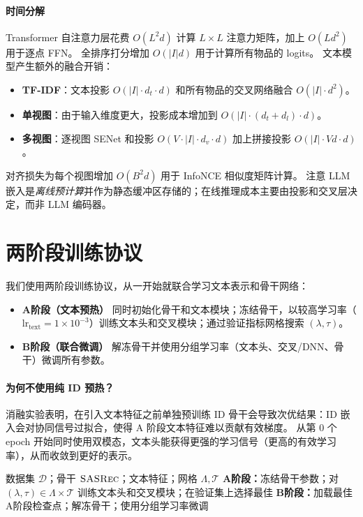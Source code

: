 \documentclass[sigconf,natbib=true]{acmart}
\newcommand{\base}{\textsc{SASRec}\xspace}
\newcommand{\tfidf}{\textsc{TF-IDF}\xspace}
\newcommand{\llm}{\textsc{LLM}\xspace}
\begin{document}
\paragraph{时间分解}
Transformer 自注意力层花费 $O(L^2d)$ 计算 $L\times L$ 注意力矩阵，加上 $O(Ld^2)$ 用于逐点 FFN。
全排序打分增加 $O(|I|d)$ 用于计算所有物品的 logits。
文本模型产生额外的融合开销：
\begin{itemize}[leftmargin=*,itemsep=1pt]
  \item \textbf{\tfidf}：文本投影 $O(|I| \cdot d_t \cdot d)$ 和所有物品的交叉网络融合 $O(|I| \cdot d^2)$。
  \item \textbf{单视图}：由于输入维度更大，投影成本增加到 $O(|I| \cdot (d_t + d_l) \cdot d)$。
  \item \textbf{多视图}：逐视图 SENet 和投影 $O(V \cdot |I| \cdot d_v \cdot d)$ 加上拼接投影 $O(|I| \cdot Vd \cdot d)$。
\end{itemize}
对齐损失为每个视图增加 $O(B^2 d)$ 用于 InfoNCE 相似度矩阵计算。
注意 \llm 嵌入是\emph{离线预计算}并作为静态缓冲区存储的；在线推理成本主要由投影和交叉层决定，而非 \llm 编码器。

\section{两阶段训练协议}
我们使用两阶段训练协议，从一开始就联合学习文本表示和骨干网络：
\begin{itemize}[leftmargin=*,itemsep=2pt]
  \item \textbf{A阶段（文本预热）} 同时初始化骨干和文本模块；冻结骨干，以较高学习率（$\text{lr}_{\text{text}}=1\times10^{-3}$）训练文本头和交叉模块；通过验证指标网格搜索 $(\lambda,\tau)$。
  \item \textbf{B阶段（联合微调）} 解冻骨干并使用分组学习率（文本头、交叉/DNN、骨干）微调所有参数。
\end{itemize}
\paragraph{为何不使用纯 ID 预热？}
消融实验表明，在引入文本特征之前单独预训练 ID 骨干会导致次优结果：ID 嵌入会对协同信号过拟合，使得 A 阶段文本特征难以贡献有效梯度。
从第 0 个 epoch 开始同时使用双模态，文本头能获得更强的学习信号（更高的有效学习率），从而收敛到更好的表示。

\begin{algorithm}[t]
\caption{两阶段训练（A阶段 + B阶段）}
\label{alg:two-phase}
\begin{algorithmic}[1]
\Require 数据集 $\mathcal{D}$；骨干 $\base$；文本特征；网格 $\Lambda,\mathcal{T}$
\State \textbf{A阶段：}冻结骨干参数；对 $(\lambda,\tau)\in \Lambda\times\mathcal{T}$ 训练文本头和交叉模块；在验证集上选择最佳
\State \textbf{B阶段：}加载最佳A阶段检查点；解冻骨干；使用分组学习率微调
\end{algorithmic}
\end{algorithm}
\end{document}
